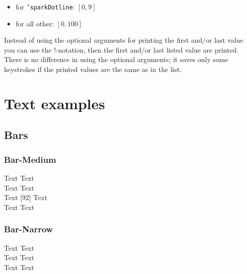 \documentclass[fontsize=11pt,DIV=14,parskip=half-]{scrartcl}
\DeclareRobustCommand\cs[1]{\mbox{\texttt{\char`\\#1}}}
\begin{document}
\begin{itemize}
\item for \cs{sparkDotline}: $[0,9]$
\item for all other: $[0,100]$
\end{itemize}


Instead of using the optional arguments for printing the first and/or last value you
can use the !-notation, then the first and/or last listed value are printed. There is no difference
in using the optional arguments; it saves only some keystrokes if the printed values are
the same as in the list.

\section{Text examples}

\subsection{Bars}

%

\subsubsection{Bar-Medium}

\begin{LTXexample}[pos=t]
Text  Text\\
Text  Text\\
Text [92] Text\\
Text  Text
\end{LTXexample}


\subsubsection{Bar-Narrow}

\begin{LTXexample}[pos=t]
Text  Text\\
Text  Text\\
Text  Text
\end{LTXexample}
\end{document}
